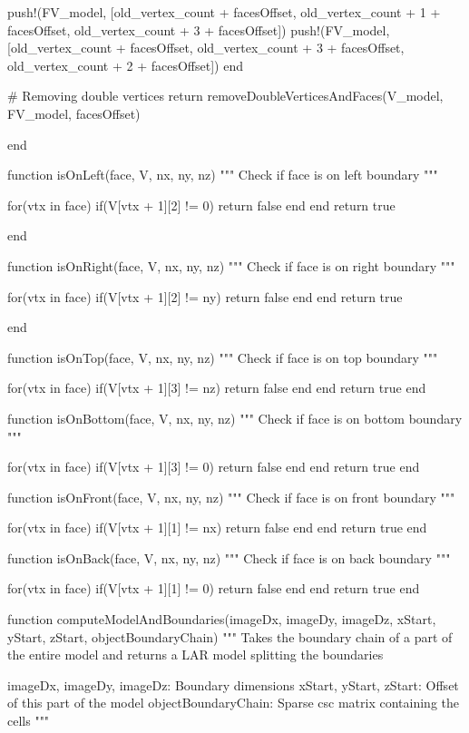 \documentclass[11pt,oneside]{article}	%
\begin{document}
{    push!(FV_model, [old_vertex_count + facesOffset, old_vertex_count + 1 + facesOffset, old_vertex_count + 3 + facesOffset])
    push!(FV_model, [old_vertex_count + facesOffset, old_vertex_count + 3 + facesOffset, old_vertex_count + 2 + facesOffset])
  end

  # Removing double vertices
  return removeDoubleVerticesAndFaces(V_model, FV_model, facesOffset)

end

function isOnLeft(face, V, nx, ny, nz)
  """
  Check if face is on left boundary
  """

  for(vtx in face)
    if(V[vtx + 1][2] != 0)
      return false
    end
  end
  return true

end

function isOnRight(face, V, nx, ny, nz)
  """
  Check if face is on right boundary
  """

  for(vtx in face)
    if(V[vtx + 1][2] != ny)
      return false
    end
  end
  return true

end

function isOnTop(face, V, nx, ny, nz)
  """
  Check if face is on top boundary
  """

  for(vtx in face)
    if(V[vtx + 1][3] != nz)
      return false
    end
  end
  return true
end

function isOnBottom(face, V, nx, ny, nz)
  """
  Check if face is on bottom boundary
  """

  for(vtx in face)
    if(V[vtx + 1][3] != 0)
      return false
    end
  end
  return true
end

function isOnFront(face, V, nx, ny, nz)
  """
  Check if face is on front boundary
  """

  for(vtx in face)
    if(V[vtx + 1][1] != nx)
      return false
    end
  end
  return true
end

function isOnBack(face, V, nx, ny, nz)
  """
  Check if face is on back boundary
  """

  for(vtx in face)
    if(V[vtx + 1][1] != 0)
      return false
    end
  end
  return true
end

function computeModelAndBoundaries(imageDx, imageDy, imageDz,
                      xStart, yStart, zStart,
                      objectBoundaryChain)
  """
  Takes the boundary chain of a part of the entire model
  and returns a LAR model splitting the boundaries

  imageDx, imageDy, imageDz: Boundary dimensions
  xStart, yStart, zStart: Offset of this part of the model
  objectBoundaryChain: Sparse csc matrix containing the cells
  """

}
\end{document}
